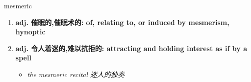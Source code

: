 
\begin{frame}
{\huge mesmeric}
\begin{center}
\begin{enumerate}\Large
  \item \textbf{adj. 催眠的,催眠术的: of, relating to, or induced by mesmerism, hynoptic}
  \item \textbf{adj. 令人着迷的,难以抗拒的: attracting and holding interest as if by a spell}
  \begin{itemize}
    \item \em{\Large{the mesmeric recital 迷人的独奏}}
  \end{itemize}
\end{enumerate}
\end{center}
\end{frame}
